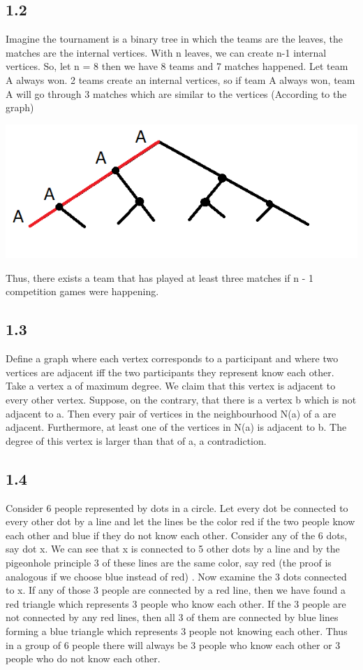 \documentclass{article}
\begin{document}
\subsection*{1.2}
Imagine the tournament is a binary tree in which the teams are the leaves, the matches are the internal vertices. With n leaves, we can create n-1 internal vertices. So, let n = 8 then we have 8 teams and 7 matches happened. Let team A always won. 2 teams create an internal vertices, so if team A always won, team A will go through 3 matches which are similar to the vertices (According to the graph) 
\begin{center}
    \includegraphics[scale = 0.4]{problem_1/graph1.png}
\end{center}
Thus, there exists a team that has played at least three matches if n - 1 competition games were happening.
\subsection*{1.3}
Define a graph where each vertex corresponds to a participant and where two
vertices are adjacent iff the two participants they represent know each other. Take a
vertex a of maximum degree. We claim that this vertex is adjacent to every other vertex.
Suppose, on the contrary, that there is a vertex b which is not adjacent to a. Then every
pair of vertices in the neighbourhood N(a) of a are adjacent. Furthermore, at least one of
the vertices in N(a) is adjacent to b. The degree of this vertex is larger than that of a, a
contradiction.
\subsection*{1.4}
Consider 6 people represented by dots in a circle. Let every dot be connected to every other dot by a line and let the lines be the color red if the two people know each other and blue if they do not know each other. Consider any of the 6 dots, say dot x. We can see that x is connected to 5 other dots by a line and by the pigeonhole principle 3 of these lines are the same color, say red (the proof is analogous if we choose blue instead of red) . Now examine the 3 dots connected to x. If any of those 3 people are connected by a red line, then we have found a red triangle which represents 3 people who know each other. If the 3 people are not connected by any red lines, then all 3 of them are connected by blue lines forming a blue triangle which represents 3 people not knowing each other. Thus in a group of 6 people there will always be 3 people who know each other or 3 people who do not know each other.
\end{document}
